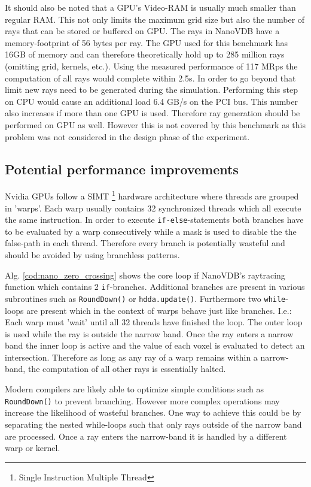 It should also be noted that a GPU's Video-RAM is usually much smaller than regular RAM.
This not only limits the maximum grid size but also the number of rays that can be stored or buffered on GPU.
The rays in NanoVDB have a memory-footprint of 56 bytes per ray.
The GPU used for this benchmark has 16GB of memory and can therefore theoretically hold up to 285 million rays (omitting grid, kernels, etc.).
Using the measured performance of 117 MRps the computation of all rays would complete within 2.5s.
In order to go beyond that limit new rays need to be generated during the simulation.
Performing this step on CPU would cause an additional load 6.4 GB/s on the PCI bus.
This number also increases if more than one GPU is used.
Therefore ray generation should be performed on GPU as well.
However this is not covered by this benchmark as this problem was not considered in the design phase of the experiment.

\subsection{Potential performance improvements}
Nvidia GPUs follow a SIMT \footnote{Single Instruction Multiple Thread} hardware architecture where threads are grouped in 'warps'.
Each warp usually contains 32 synchronized threads which all execute the same instruction.
In order to execute \texttt{if-else}-statements both branches have to be evaluated by a warp consecutively while a mask is used to disable the the false-path in each thread. \cite[Chapter~3.6.3]{mccool}
Therefore every branch is potentially wasteful and should be avoided by using branchless patterns.


Alg. \ref{cod:nano_zero_crossing} shows the core loop if NanoVDB's raytracing function which contains 2 \texttt{if}-branches.
Additional branches are present in various subroutines such as \texttt{RoundDown()} or \texttt{hdda.update()}.
Furthermore two \texttt{while}-loops are present which in the context of warps behave just like branches.
I.e.: Each warp must 'wait' until all 32 threads have finished the loop.
The outer loop is used while the ray is outside the narrow band. Once the ray enters a narrow band the inner loop is active and the value of each voxel is evaluated to detect an intersection.
Therefore as long as any ray of a warp remains within a narrow-band, the computation of all other rays is essentially halted.

Modern compilers are likely able to optimize simple conditions such as \texttt{RoundDown()} to prevent branching.
However more complex operations may increase the likelihood of wasteful branches.
One way to achieve this could be by separating the nested while-loops such that only rays outside of the narrow band are processed.
Once a ray enters the narrow-band it is handled by a different warp or kernel.

